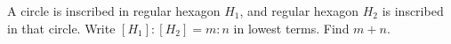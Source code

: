 A circle is inscribed in regular hexagon $H_1$, and regular hexagon $H_2$ is inscribed in that circle. Write $[H_1]:[H_2]=m:n$ in lowest terms. Find $m+n$.
